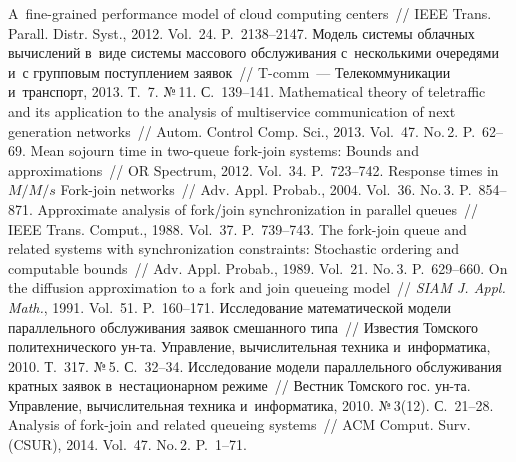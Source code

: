 \begin{multicols}{2}
{{\begin{thebibliography}{99}
 A~fine-grained performance model of cloud 
computing centers~// IEEE Trans. Parall. Distr. Syst., 
2012. Vol.~24. P.~2138--2147.
 Модель системы облачных вычислений в~виде 
системы массового обслуживания с~несколькими очередями и~с групповым 
поступлением заявок~// T-comm~--- Телекоммуникации и~транспорт, 2013. Т.~7. 
№\,11. С.~139--141.
Mathematical theory of 
teletraffic and its application to the analysis of multiservice communication of 
next generation networks~// Autom. Control Comp. Sci., 2013. 
Vol.~47. No.\,2. P.~62--69.
 Mean sojourn time in two-queue fork-join systems: Bounds 
and approximations~// OR Spectrum, 2012. Vol.~34. P.~723--742.
Response times in $M/M/s$ Fork-join networks~// Adv. 
Appl. Probab., 2004. Vol.~36. No.\,3. P.~854--871.
 Approximate analysis of fork/join synchronization in 
parallel queues~// IEEE Trans. Comput., 1988. Vol.~37. P.~739--743.
 The fork-join queue and related 
systems with synchronization constraints: Stochastic ordering and computable 
bounds~// Adv. Appl. Probab., 1989. Vol.~21. No.\,3. P.~629--660.
 On the diffusion approximation to a fork and join queueing model~// 
\textit{SIAM J. Appl. Math.}, 1991. Vol.~51. P.~160--171.
 Исследование математической модели 
параллельного обслуживания заявок смешанного типа~// Известия Томского 
политехнического ун-та. Управление, вычислительная техника и~информатика, 2010. 
Т.~317. №\,5. С.~32--34.
 Исследование модели параллельного 
обслуживания кратных заявок в~нестационарном режиме~// Вестник Томского 
гос. ун-та. Управление, вычислительная техника 
и~информатика, 2010. №\,3(12). С.~21--28.
 Analysis of fork-join and related queueing systems~// ACM 
Comput. Surv. (CSUR), 2014. Vol.~47. No.\,2. P.~1--71.
 \end{thebibliography}

 }
 }

\end{multicols}

\vspace*{-3pt}

